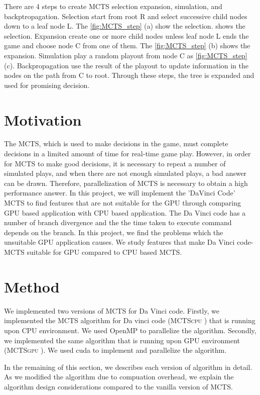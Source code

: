 \documentclass[conference]{IEEEtran}
\newcommand{\cpu} {\textsc{MCTScpu} }
\newcommand{\gpu} {\textsc{MCTSgpu} }
\begin{document}
There are 4 steps to create MCTS selection expansion, simulation, and backptropagation.
Selection start from root R and select successive child nodes down to a leaf node L. The \cref{fig:MCTS_step} (a) show the selection. shows the selection.
Expansion create one or more child nodes unless leaf node L ends the game and choose node C from one of them. The \cref{fig:MCTS_step} (b) shows the expansion.
Simulation play a random playout from node C as \cref{fig:MCTS_step} (c).
Backpropagation use the result of the playout to update information in the nodes on the path from C to root. 
Through these steps, the tree is expanded and used for promising decision.

\section{Motivation}
The MCTS, which is used to make decisions in the game, must complete decisions in a limited amount of time for real-time game play. 
However, in order for MCTS to make good decisions, it is necessary to repeat a number of simulated plays, and when there are not enough simulated plays, a bad answer can be drawn. 
Therefore, parallelization of MCTS is necessary to obtain a high performance answer.
In this project, we will implement the 'DaVinci Code' MCTS to find features that are not suitable for the GPU through comparing GPU based application with CPU based application.
The Da Vinci code has a number of branch divergence and the the time taken to execute command depends on the branch.
In this project, we find the problems which the unsuitable GPU application causes.
We study features that make Da Vinci code-MCTS suitable for GPU compared to CPU based MCTS.

\section{Method}
We implemented two versions of MCTS for Da Vinci code. 
Firstly, we implemented the MCTS algorithm for Da vinci code (\cpu) that is running upon CPU environment.
We used OpenMP to parallelize the algorithm.
Secondly, we implemented the same algorithm that is running upon GPU environment (\gpu).
We used cuda to implement and parallelize the algorithm.

In the remaining of this section, we describes each version of algorithm in detail. 
As we modified the algorithm due to compuation overhead, we explain the algorithm design considerations compared to the vanilla version of MCTS.
\end{document}

